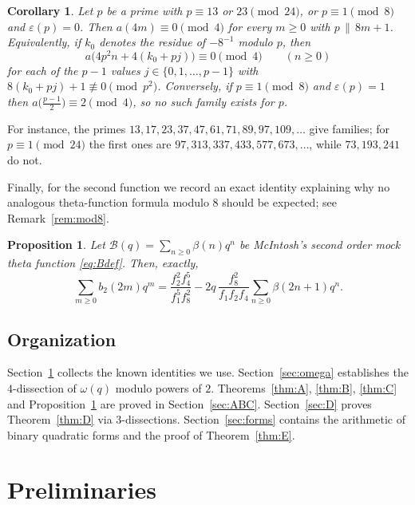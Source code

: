 \documentclass[11pt]{amsart}
\newtheorem{proposition}[theorem]{Proposition}
\newtheorem{corollary}[theorem]{Corollary}
\theoremstyle{definition}
\theoremstyle{remark}
\numberwithin{equation}{section}
\begin{document}
\begin{corollary}\label{cor:families}
Let $p$ be a prime with $p\equiv 13$ or $23\pmod{24}$, or $p\equiv1\pmod8$ and $\varepsilon(p)=0$. Then $a(4m)\equiv0\pmod 4$ for every $m\ge0$ with $p\,\|\,8m+1$. Equivalently, if $k_0$ denotes the residue of $-8^{-1}$ modulo $p$, then
\[
a\big(4p^2n+4(k_0+pj)\big)\equiv0\pmod 4\qquad(n\ge0)
\]
for each of the $p-1$ values $j\in\{0,1,\dots,p-1\}$ with $8(k_0+pj)+1\not\equiv0\pmod{p^2}$. Conversely, if $p\equiv1\pmod 8$ and $\varepsilon(p)=1$ then $a\big(\frac{p-1}{2}\big)\equiv2\pmod4$, so no such family exists for $p$.
\end{corollary}

For instance, the primes $13,17,23,37,47,61,71,89,97,109,\dots$ give families; for $p\equiv 1\pmod{24}$ the first ones are $97,313,337,433,577,673,\dots$, while $73,193,241$ do not.

Finally, for the second function we record an exact identity explaining why no analogous theta-function formula modulo $8$ should be expected; see Remark~\ref{rem:mod8}.

\begin{proposition}\label{prop:exact}
Let $\mathcal B(q)=\sum_{n\ge0}\beta(n)q^n$ be McIntosh's second order mock theta function \eqref{eq:Bdef}. Then, exactly,
\[
\sum_{m\ge0}b_2(2m)q^m=\frac{f_2^2f_4^5}{f_1^5f_8^2}-2q\,\frac{f_8^2}{f_1f_2f_4}\sum_{n\ge0}\beta(2n+1)q^n .
\]
\end{proposition}

\subsection*{Organization} Section~\ref{sec:prelim} collects the known identities we use. Section~\ref{sec:omega} establishes the $4$-dissection of $\omega(q)$ modulo powers of $2$. Theorems~\ref{thm:A}, \ref{thm:B}, \ref{thm:C} and Proposition~\ref{prop:exact} are proved in Section~\ref{sec:ABC}. Section~\ref{sec:D} proves Theorem~\ref{thm:D} via $3$-dissections. Section~\ref{sec:forms} contains the arithmetic of binary quadratic forms and the proof of Theorem~\ref{thm:E}.

\section{Preliminaries}\label{sec:prelim}
\end{document}
